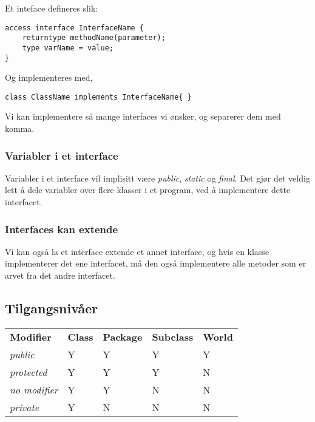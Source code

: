 \documentclass[a4paper,norsk,10pt]{article}
\begin{document}
Et inteface defineres slik:

\begin{verbatim}
access interface InterfaceName {
    returntype methodName(parameter);
    type varName = value;
}
\end{verbatim}

Og implementeres med, 

\begin{verbatim}
class ClassName implements InterfaceName{ }
\end{verbatim}

Vi kan implementere så mange interfaces vi ønsker, og separerer dem
med komma.
\subsubsection{Variabler i et interface}
\label{sec-16.2.1}


Variabler i et interface vil implisitt være \emph{public}, \emph{static} og
\emph{final}. Det gjør det veldig lett å dele variabler over flere klasser
i et program, ved å implementere dette interfacet.
\subsubsection{Interfaces kan extende}
\label{sec-16.2.2}


Vi kan også la et interface extende et annet interface, og hvis en
klasse implementerer det ene interfacet, må den også implementere alle
metoder som er arvet fra det andre interfacet.
\subsection{Tilgangsnivåer}
\label{sec-16.3}


\begin{center}
\begin{tabular}{lllll}
 \textbf{Modifier}   &  \textbf{Class}  &  \textbf{Package}  &  \textbf{Subclass}  &  \textbf{World}  \\
 \emph{public}       &  Y               &  Y                 &  Y                  &  Y               \\
 \emph{protected}    &  Y               &  Y                 &  Y                  &  N               \\
 \emph{no modifier}  &  Y               &  Y                 &  N                  &  N               \\
 \emph{private}      &  Y               &  N                 &  N                  &  N               \\
\end{tabular}
\end{center}
\end{document}
